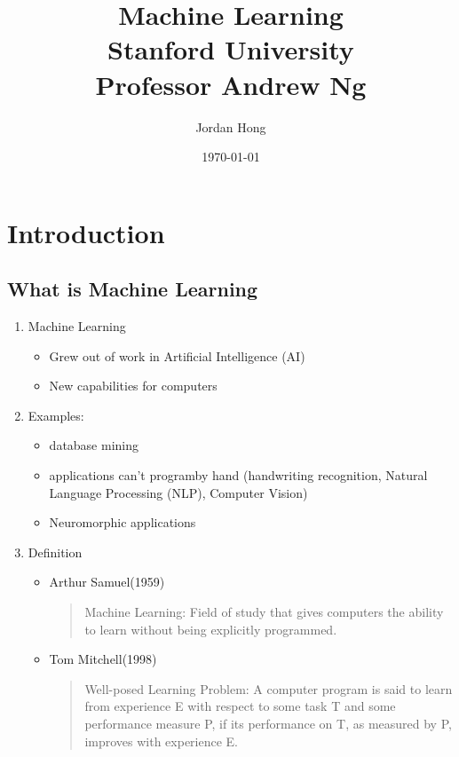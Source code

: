 \documentclass[letter]{article}
\title{%
    Machine Learning\\
    \large Stanford University \\
    Professor Andrew Ng}
\author{Jordan Hong}
\date{\today}
\begin{document}
\maketitle
\tableofcontents

\section{Introduction}
    \subsection{What is Machine Learning}
    
    \begin{enumerate}
        \item Machine Learning 
            \begin{itemize}
                \item Grew out of work in Artificial Intelligence (AI)
                \item New capabilities for computers
            \end{itemize}
        \item Examples: 
            \begin{itemize}
                \item database mining
                \item applications can't programby hand (handwriting recognition, Natural Language Processing (NLP), Computer Vision) 
                \item Neuromorphic applications
            \end{itemize}
           
        \item Definition
            \begin{itemize}
                \item Arthur Samuel(1959) \\
                    \begin{quote}
                        Machine Learning: Field of study that gives computers the ability to learn without being explicitly programmed.

                    \end{quote}
                \item Tom Mitchell(1998) \\
                    \begin{quote}
                         Well-posed Learning Problem: A computer program is said to learn from experience E with respect to some task T and some performance measure P, if its performance on T, as measured by P, improves with experience E. 


\end{quote}
\end{itemize}
\end{enumerate}
\end{document}
